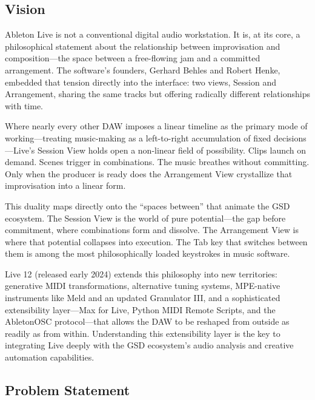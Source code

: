 \documentclass[11pt,letterpaper]{article}
\begin{document}
\subsection{Vision}

Ableton Live is not a conventional digital audio workstation. It is, at its core, a philosophical
statement about the relationship between improvisation and composition---the space between
a free-flowing jam and a committed arrangement. The software's founders, Gerhard Behles and
Robert Henke, embedded that tension directly into the interface: two views, Session and
Arrangement, sharing the same tracks but offering radically different relationships with time.

Where nearly every other DAW imposes a linear timeline as the primary mode of
working---treating music-making as a left-to-right accumulation of fixed decisions---Live's
Session View holds open a non-linear field of possibility. Clips launch on demand. Scenes
trigger in combinations. The music breathes without committing. Only when the producer is
ready does the Arrangement View crystallize that improvisation into a linear form.

This duality maps directly onto the ``spaces between'' that animate the GSD ecosystem. The
Session View is the world of pure potential---the gap before commitment, where combinations
form and dissolve. The Arrangement View is where that potential collapses into execution. The
Tab key that switches between them is among the most philosophically loaded keystrokes in
music software.

Live 12 (released early 2024) extends this philosophy into new territories: generative MIDI
transformations, alternative tuning systems, MPE-native instruments like Meld and an updated
Granulator III, and a sophisticated extensibility layer---Max for Live, Python MIDI Remote
Scripts, and the AbletonOSC protocol---that allows the DAW to be reshaped from outside as
readily as from within. Understanding this extensibility layer is the key to integrating Live
deeply with the GSD ecosystem's audio analysis and creative automation capabilities.

\subsection{Problem Statement}
\end{document}
